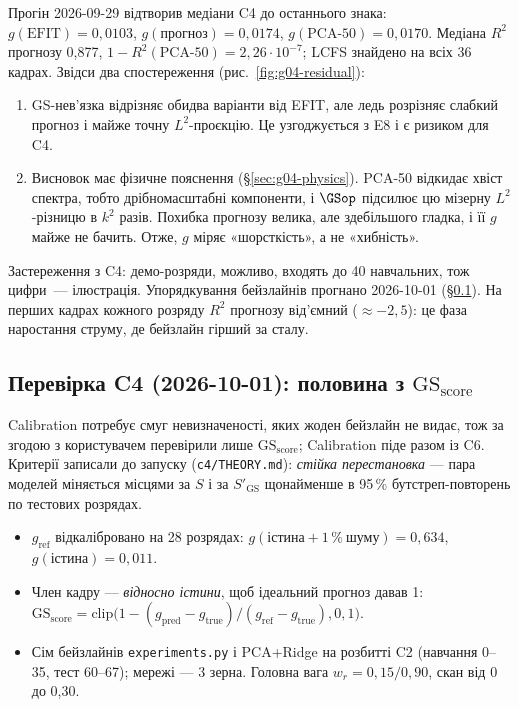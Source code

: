 Прогін 2026-09-29 відтворив медіани C4 до останнього знака: $g(\mathrm{EFIT})=0{,}0103$, $g(\text{прогноз})=0{,}0174$, $g(\text{PCA-50})=0{,}0170$. Медіана $R^2$ прогнозу 0,877, $1-R^2(\text{PCA-50})=2{,}26\cdot10^{-7}$; LCFS знайдено на всіх 36 кадрах. Звідси два спостереження (рис.~\ref{fig:g04-residual}):
\begin{enumerate}
\item GS-нев'язка відрізняє обидва варіанти від EFIT, але ледь розрізняє слабкий прогноз і майже точну $L^2$-проєкцію. Це узгоджується з E8 і є ризиком для C4.
\item Висновок має фізичне пояснення (\S\ref{sec:g04-physics}). PCA-50 відкидає хвіст спектра, тобто дрібномасштабні компоненти, і $\GSop$ підсилює цю мізерну $L^2$-різницю в $k^2$ разів. Похибка прогнозу велика, але здебільшого гладка, і її $g$ майже не бачить. Отже, $g$ міряє «шорсткість», а не «хибність».
\end{enumerate}
Застереження з C4: демо-розряди, можливо, входять до 40 навчальних, тож цифри~--- ілюстрація. Упорядкування бейзлайнів прогнано 2026-10-01 (\S\ref{sec:g04-c4test}). На перших кадрах кожного розряду $R^2$ прогнозу від'ємний ($\approx-2{,}5$): це фаза наростання струму, де бейзлайн гірший за сталу.

\subsection{Перевірка C4 (2026-10-01): половина з \texorpdfstring{$\mathrm{GS}_{\mathrm{score}}$}{GS\_score}}\label{sec:g04-c4test}

Calibration потребує смуг невизначеності, яких жоден бейзлайн не видає, тож за згодою з
користувачем перевірили лише $\mathrm{GS}_{\mathrm{score}}$; Calibration піде разом із C6. Критерії
записали до запуску (\texttt{c4/THEORY.md}): \emph{стійка перестановка} --- пара моделей міняється
місцями за $S$ і за $S'_{\mathrm{GS}}$ щонайменше в 95\,\% бутстреп-повторень по тестових розрядах.
\begin{itemize}
\item $g_{\mathrm{ref}}$ відкалібровано на 28 розрядах: $g(\text{істина}+1\,\%\ \text{шуму})=0{,}634$,
  $g(\text{істина})=0{,}011$.
\item Член кадру --- \emph{відносно істини}, щоб ідеальний прогноз давав 1:
  $\mathrm{GS}_{\mathrm{score}}=\mathrm{clip}\bigl(1-(g_{\mathrm{pred}}-g_{\mathrm{true}})/(g_{\mathrm{ref}}-g_{\mathrm{true}}),0,1\bigr)$.
\item Сім бейзлайнів \texttt{experiments.py} і PCA+Ridge на розбитті C2 (навчання 0--35, тест 60--67);
  мережі --- 3 зерна. Головна вага $w_r=0{,}15/0{,}90$, скан від 0 до 0,30.
\end{itemize}

